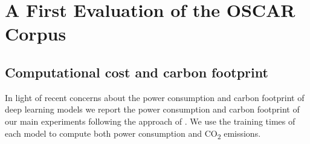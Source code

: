 \chapter{A First Evaluation of the OSCAR Corpus}
\label{sec:appendix}

\section{Computational cost and carbon footprint}\label{cost}

In light of recent concerns about the power consumption and carbon footprint of deep learning models \citep{schwartz-etal-2020-green, bender-etal-2021-on} we report the power consumption and carbon footprint of our main experiments following the approach of \citet{strubell-etal-2019-energy}. We use the training times of each model to compute both power consumption and CO\textsubscript{2} emissions.

